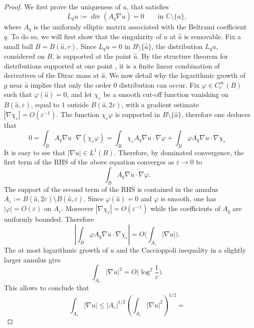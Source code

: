 \documentclass[reqno]{amsart}
\numberwithin{equation}{section}
\theoremstyle{definition}
\theoremstyle{remark}
\begin{document}
\begin{proof}
We first prove the uniqueness of $u$, that satisfies
\[
    L_q u:=\operatorname{div}(A_q\nabla u)=0
    \qquad\text{in }\mathbb C\setminus\{\hat{a}\},
\]
where $A_q$ is the uniformly elliptic matrix associated with the Beltrami
coefficient $q$. To do so, we will first show that the singularity of $u$ at $\hat{a}$ is removable. Fix a small ball $B=B(\hat{a},r)$. Since $L_q u=0$ in $B\setminus\{\hat{a}\}$, the
distribution $L_q u$, considered on $B$, is supported at the point
$\hat{a}$. By the structure theorem for distributions supported at one point \cite[Theorem 2.3.4]{HormanderI}, it
is a finite linear combination of derivatives of the Dirac mass at $\hat{a}$. We now detail why the logarithmic growth of $g$ near $\hat{a}$ implies that only the order $0$ distribution can occur. Fix $\varphi\in C_c^\infty(B)$ such that $\varphi(\hat{a})=0$, and let
$\chi_\varepsilon$ be a smooth cut-off function vanishing on
$B(\hat{a},\varepsilon)$, equal to $1$ outside $B(\hat{a},2\varepsilon)$, with a gradient estimate $|\nabla\chi_\varepsilon| =O(\varepsilon^{-1})$. The function
$\chi_\varepsilon\varphi$ is supported in $B\setminus\{\hat{a}\}$, therefore one deduces that 
\begin{equation*}
	 0= \int_B A_q\nabla u\cdot\nabla(\chi_\varepsilon\varphi) = \int_B \chi_\varepsilon A_q\nabla u\cdot\nabla\varphi
    +
    \int_B \varphi A_q\nabla u\cdot\nabla\chi_\varepsilon 
\end{equation*}
It is easy to see that $|\nabla u | \in L^1(B)$. Therefore, by dominated convergence, the first term of the RHS of the above equation converges as $\varepsilon\to 0 $ to
\[
    \int_B A_q\nabla u\cdot\nabla\varphi .
\]
The support of the second term of the RHS is contained in the annulus
$A_\varepsilon:=B(\hat{a},2\varepsilon)\setminus B(\hat{a},\varepsilon)$. Since $\varphi(\hat{a})=0$ and $\varphi$ is smooth, one has $|\varphi|=O(\varepsilon)$ on
\(A_\varepsilon\). Moreover $|\nabla\chi_\varepsilon|=O(\varepsilon^{-1})$ while the coefficients of $A_{q}$ are uniformly bounded. Therefore
\[
    \left|
    \int_B \varphi A_q\nabla u\cdot\nabla\chi_\varepsilon
    \right| =
    O\Big(
    \int_{A_\varepsilon} |\nabla u|\Big).
\]
The at most logarithmic growth of $u$ and the Caccioppoli inequality \cite[Corollary 1.37]{HanLin} in a slightly
larger annulus give
\[
    \int_{A_\varepsilon}|\nabla u|^2
     =
    O\Big(
    \log^2\frac1\varepsilon\Big) .
\]
This allows to conclude that
\[
    \int_{A_\varepsilon}|\nabla u|
    \le
    |A_\varepsilon|^{1/2}
    \left(\int_{A_\varepsilon}|\nabla u|^2\right)^{1/2}
     =
\]
\end{proof}
\end{document}
